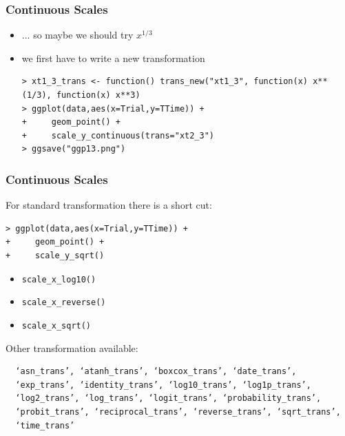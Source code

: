 \documentclass[xcolor={table},c]{beamer}
\begin{document}
\begin{frame}[fragile]\frametitle{Continuous Scales}
  \begin{itemize}
  \item ... so maybe we should try $x^{1/3}$
  \item we first have to write a new transformation
\begin{verbatim}
> xt1_3_trans <- function() trans_new("xt1_3", function(x) x**(1/3), function(x) x**3)
> ggplot(data,aes(x=Trial,y=TTime)) +
+     geom_point() +
+     scale_y_continuous(trans="xt2_3")
> ggsave("ggp13.png")
\end{verbatim}
  \end{itemize}
\begin{center}
\end{center}
\end{frame}


\begin{frame}[fragile]\frametitle{Continuous Scales}
For standard transformation there is a short cut:
\begin{verbatim}
> ggplot(data,aes(x=Trial,y=TTime)) +
+     geom_point() +
+     scale_y_sqrt()
\end{verbatim}
  \begin{itemize}
  \item \texttt{scale\_x\_log10()}
  \item \texttt{scale\_x\_reverse()}
  \item \texttt{scale\_x\_sqrt()}
  \end{itemize}
Other transformation available: \small
\begin{verbatim}
  ‘asn_trans’, ‘atanh_trans’, ‘boxcox_trans’, ‘date_trans’,
  ‘exp_trans’, ‘identity_trans’, ‘log10_trans’, ‘log1p_trans’,
  ‘log2_trans’, ‘log_trans’, ‘logit_trans’, ‘probability_trans’,
  ‘probit_trans’, ‘reciprocal_trans’, ‘reverse_trans’, ‘sqrt_trans’,
  ‘time_trans’
\end{verbatim}
\end{frame}
\end{document}
